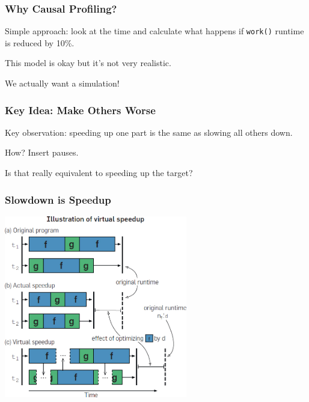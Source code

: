\begin{frame}
\frametitle{Why Causal Profiling?}

Simple approach: look at the time and calculate what happens if \texttt{work()} runtime is reduced by 10\%.

This model is okay but it's not very realistic.

We actually want a simulation!


\end{frame}


\begin{frame}
\frametitle{Key Idea: Make Others Worse}

Key observation: speeding up one part is the same as slowing all others down.

How? Insert pauses.

Is that really equivalent to speeding up the target?

\end{frame}


\begin{frame}
\frametitle{Slowdown is Speedup}

\begin{center}
	\includegraphics[width=0.6\textwidth]{images/virtual-speedup.jpg}
\end{center}

\end{frame}



